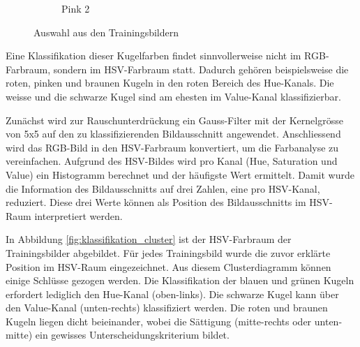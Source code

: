 \begin{figure}[h!]
\begin{subfigure}[b]{0.15\textwidth}
        \caption{Pink 2}
        \label{fig:classification_pink_ball_2}
    \end{subfigure}
    \caption{Auswahl aus den Trainingsbildern}
    \label{fig:classification_trainingdata_examples}
\end{figure}

Eine Klassifikation dieser Kugelfarben findet sinnvollerweise nicht im RGB-Farbraum, sondern im HSV-Farbraum\cite{wiki:hsv_color_space} statt.
Dadurch gehören beispielsweise die roten, pinken und braunen Kugeln in den roten Bereich des Hue-Kanals.
Die weisse und die schwarze Kugel sind am ehesten im Value-Kanal klassifizierbar.

Zunächst wird zur Rauschunterdrückung ein Gauss-Filter mit der Kernelgrösse von 5x5 auf den zu klassifizierenden Bildausschnitt angewendet.
Anschliessend wird das RGB-Bild in den HSV-Farbraum konvertiert, um die Farbanalyse zu vereinfachen.
Aufgrund des HSV-Bildes wird pro Kanal (Hue, Saturation und Value) ein Histogramm berechnet und der häufigste Wert ermittelt.
Damit wurde die Information des Bildausschnitts auf drei Zahlen, eine pro HSV-Kanal, reduziert.
Diese drei Werte können als Position des Bildausschnitts im HSV-Raum interpretiert werden.

In Abbildung \ref{fig:klassifikation_cluster} ist der HSV-Farbraum der Trainingsbilder abgebildet.
Für jedes Trainingsbild wurde die zuvor erklärte Position im HSV-Raum eingezeichnet.
Aus diesem Clusterdiagramm können einige Schlüsse gezogen werden.
Die Klassifikation der blauen und grünen Kugeln erfordert lediglich den Hue-Kanal (oben-links).
Die schwarze Kugel kann über den Value-Kanal (unten-rechts) klassifiziert werden.
Die roten und braunen Kugeln liegen dicht beieinander, wobei die Sättigung (mitte-rechts oder unten-mitte) ein gewisses Unterscheidungskriterium bildet.

